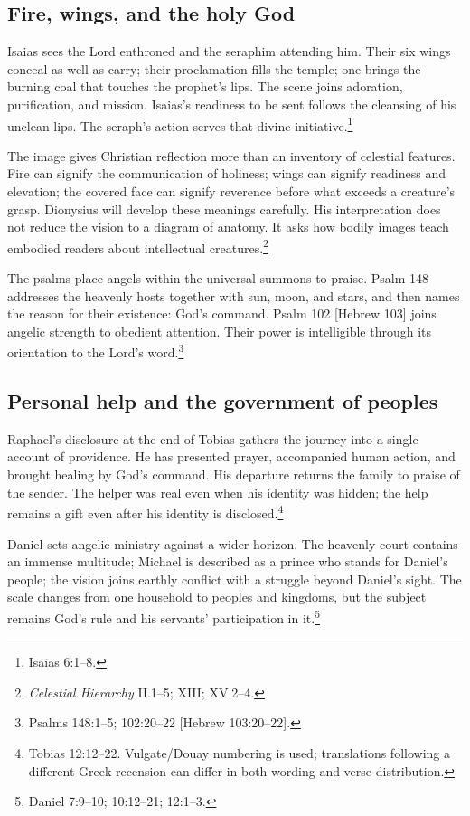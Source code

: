 \subsection{Fire, wings, and the holy God}

Isaias sees the Lord enthroned and the seraphim attending him. Their six
wings conceal as well as carry; their proclamation fills the temple; one
brings the burning coal that touches the prophet's lips. The scene joins
adoration, purification, and mission. Isaias's readiness to be sent follows
the cleansing of his unclean lips. The seraph's action serves that divine
initiative.\footnote{Isaias 6:1--8.}

The image gives Christian reflection more than an inventory of celestial
features. Fire can signify the communication of holiness; wings can signify
readiness and elevation; the covered face can signify reverence before what
exceeds a creature's grasp. Dionysius will develop these meanings carefully.
His interpretation does not reduce the vision to a diagram of anatomy.
It asks how bodily images teach embodied readers about intellectual
creatures.\footnote{\emph{Celestial Hierarchy} II.1--5; XIII; XV.2--4.}

The psalms place angels within the universal summons to praise. Psalm 148
addresses the heavenly hosts together with sun, moon, and stars, and then
names the reason for their existence: God's command. Psalm 102 [Hebrew 103]
joins angelic strength to obedient attention. Their power is intelligible
through its orientation to the Lord's word.\footnote{Psalms 148:1--5;
102:20--22 [Hebrew 103:20--22].}

\subsection{Personal help and the government of peoples}

Raphael's disclosure at the end of Tobias gathers the journey into a single
account of providence. He has presented prayer, accompanied human action,
and brought healing by God's command. His departure returns the family to
praise of the sender. The helper was real even when his identity was hidden;
the help remains a gift even after his identity is disclosed.\footnote{Tobias
12:12--22. Vulgate/Douay numbering is used; translations following a different
Greek recension can differ in both wording and verse distribution.}

Daniel sets angelic ministry against a wider horizon. The heavenly court
contains an immense multitude; Michael is described as a prince who stands
for Daniel's people; the vision joins earthly conflict with a struggle beyond
Daniel's sight. The scale changes from one household to peoples and kingdoms,
but the subject remains God's rule and his servants' participation in it.\footnote{Daniel
7:9--10; 10:12--21; 12:1--3.}

